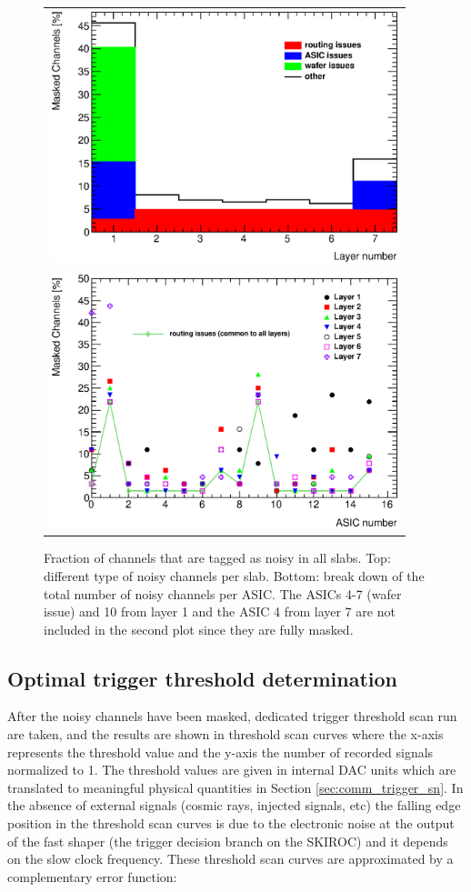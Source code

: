 \documentclass[a4paper,11pt]{article}
\begin{document}
\begin{figure}[!t]
  \centering
  \begin{tabular}{l}
  \includegraphics[width=4in]{../figs/commissioning/masked_layer.eps} \\
  \includegraphics[width=4in]{../figs/commissioning/masked_chip.eps}
  \end{tabular}
\caption{Fraction of channels that are tagged as noisy in all slabs. 
Top: different type of noisy channels per slab. 
Bottom: break down of the total number of noisy channels per ASIC. 
The ASICs 4-7 (wafer issue) and 10 from layer 1 and the ASIC 4 from layer 7 are not included
in the second plot since they are fully masked.}
\label{noisycells}
\end{figure}


\subsection{Optimal trigger threshold determination}
\label{sec:comm_trigger}

After the noisy channels have been masked, dedicated trigger threshold
scan run are taken, and the results are shown in threshold scan curves where the
x-axis represents the threshold value and the y-axis
the number of recorded signals normalized to 1. The threshold values are given in internal DAC units
which are translated to meaningful physical quantities in Section \ref{sec:comm_trigger_sn}.
In the absence of external signals (cosmic rays, injected signals, etc) 
the falling edge position in the threshold scan curves
is due to the electronic noise
at the output of the fast shaper (the trigger decision branch on the SKIROC)
and it depends on the slow clock frequency.
These threshold scan curves are approximated by a complementary error function:
\end{document}
